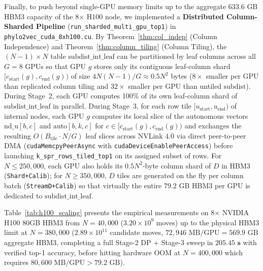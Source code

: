 \documentclass[11pt,a4paper]{article}
\theoremstyle{definition}
\begin{document}
Finally, to push beyond single-GPU memory limits up to the aggregate $633.6\text{ GB}$ HBM3 capacity of the 8$\times$ H100 node, we implemented a \textbf{Distributed Column-Sharded Pipeline} (\texttt{run\_sharded\_multi\_gpu\_top1}) in \texttt{phylo2vec\_cuda\_8xh100.cu}. By Theorem~\ref{thm:col_indep} (Column Independence) and Theorem~\ref{thm:column_tiling} (Column Tiling), the $(N-1) \times N$ table $\text{subdist\_int\_leaf}$ can be partitioned by leaf columns across all $G = 8$ GPUs so that GPU $g$ stores only its contiguous leaf-column shard $[c_{\text{start}}(g), c_{\text{end}}(g))$ of size $4N(N-1)/G \approx 0.5 N^2$ bytes ($8\times$ smaller per GPU than replicated column tiling and $32\times$ smaller per GPU than untiled $\text{subdist}$). During Stage~2, each GPU computes 100\% of its own leaf-column shard of $\text{subdist\_int\_leaf}$ in parallel. During Stage~3, for each row tile $[u_{\text{start}}, u_{\text{end}})$ of internal nodes, each GPU $g$ computes its local slice of the autonomous vectors $\text{nd\_u}[b, c]$ and $\text{auto}[b, k, c]$ for $c \in [c_{\text{start}}(g), c_{\text{end}}(g))$ and exchanges the resulting $O(B_{\text{tile}} \cdot N / G)$ leaf slices across NVLink 4.0 via direct peer-to-peer DMA (\texttt{cudaMemcpyPeerAsync} with \texttt{cudaDeviceEnablePeerAccess}) before launching \texttt{k\_spr\_rows\_tiled\_top1} on its assigned subset of rows. For $N \le 250{,}000$, each GPU also holds its $0.5 N^2$-byte column shard of $D$ in HBM3 (\texttt{Shard+Calib}); for $N \ge 350{,}000$, $D$ tiles are generated on the fly per column batch (\texttt{StreamD+Calib}) so that virtually the entire $79.2\text{ GB}$ HBM3 per GPU is dedicated to $\text{subdist\_int\_leaf}$.

Table~\ref{tab:h100_scaling} presents the empirical measurements on 8$\times$ NVIDIA H100 80GB HBM3 from $N = 40{,}000$ ($3.20 \times 10^9$ moves) up to the physical HBM3 limit at $N = 380{,}000$ ($2.89 \times 10^{11}$ candidate moves, $72{,}946\text{ MB/GPU} = 569.9\text{ GB}$ aggregate HBM3, completing a full Stage-2 DP + Stage-3 sweep in $\mathbf{205.45\text{ s}}$ with verified top-1 accuracy, before hitting hardware OOM at $N = 400{,}000$ which requires $80{,}600\text{ MB/GPU} > 79.2\text{ GB}$).
\end{document}
